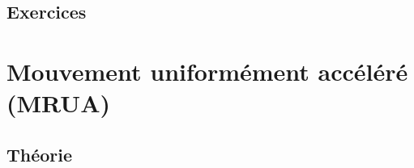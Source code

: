\documentclass[a4paper,12pt]{book}
\theoremstyle{mes_exemples}	\newtheorem{exemple}[numtho]{Exemple}
\theoremstyle{mes_tho}
\begin{document}
\subsection{Exercices}

 
\section{Mouvement uniformément accéléré (MRUA)}		\label{SecMRUA}

\subsection{Théorie}
\end{document}
